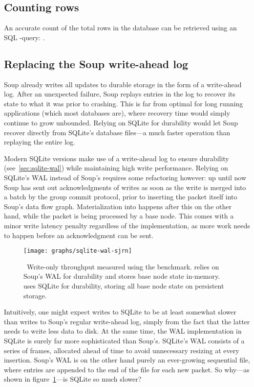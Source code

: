 \subsection{Counting rows}

An accurate count of the total rows in the database can be retrieved using an
SQL -query: .

\subsection{Replacing the Soup write-ahead log}

Soup already writes all updates to durable storage in the form of a write-ahead
log. After an unexpected failure, Soup replays entries in the log to recover its
state to what it was prior to crashing. This is far from optimal for long
running applications (which most databases are), where recovery time would
simply continue to grow unbounded. Relying on SQLite for durability would let
Soup recover directly from SQLite's database files---a much faster operation
than replaying the entire log.

Modern SQLite versions make use of a write-ahead log to ensure durability
(see~\ref{sec:sqlite-wal}) while maintaining high write performance. Relying on
SQLite's WAL instead of Soup's requires some refactoring however: up until now
Soup has sent out acknowledgments of writes as soon as the write is merged into
a batch by the group commit protocol, prior to inserting the packet itself into
Soup's data flow graph. Materialization into  happens
after this on the other hand, while the packet is being processed by a base
node. This comes with a minor write latency penalty regardless of the
 implementation, as more work needs to happen before an
acknowledgment can be sent.

\begin{figure}[H]
  \centering
  \texttt{[image: graphs/sqlite-wal-sjrn]}
  \caption{\
    Write-only throughput measured using the  benchmark. 
    relies on Soup's WAL for durability and stores base node state in-memory.
    \code{sqlite\_wal} uses SQLite for durability, storing all base node state
    on persistent storage.
  }\label{graph:sqlite-wal}
\end{figure}

Intuitively, one might expect writes to SQLite to be at least somewhat slower
than writes to Soup's regular write-ahead log, simply from the fact that the
latter needs to write less data to disk. At the same time, the WAL
implementation in SQLite is surely far more sophisticated than Soup's. SQLite's
WAL consists of a series of frames, allocated ahead of time to avoid unnecessary
resizing at every insertion. Soup's WAL is on the other hand purely an
ever-growing sequential file, where entries are appended to the end of the file
for each new packet. So why---as shown in figure~\ref{graph:sqlite-wal}---is
SQLite so much slower?

